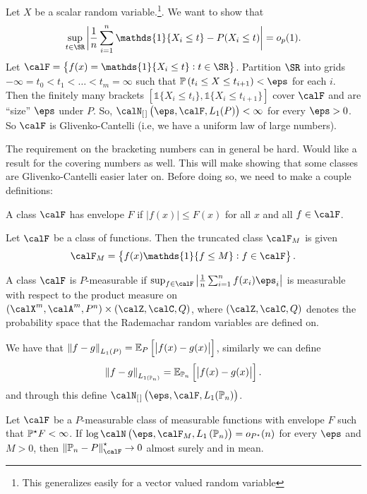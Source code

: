 \begin{example*}
	Let \(X\) be a scalar random variable.\footnote{This generalizes easily for a vector valued random variable}. We want to show that 
	\[
		\sup_{t\in\SR}\bigg| \frac{1}{n}\sum_{i=1}^n \mathds{1}\{X_i\leq t\}-P(X_i\leq t)\bigg|=o_p(1)
	.\]
	Let \(\calF = \left\{f(x)=\mathds{1}\{X_i\leq t\}: t \in \SR\right\}\). Partition \(\SR\) into grids  \(-\infty = t_0 < t_1 < \dots< t_m = \infty\) such that \(\P\left(t_i \leq X \leq t_{i+1}\right)<\eps\) for each \(i\). Then the finitely many brackets \(\left[\mathds{1}\{X_i \leq t_i\},\mathds{1}\{X_i \leq t_{i+1}\}\right]\) cover \(\calF\) and are ``size'' \(\eps\) under \(P\). So, \(\calN_{[\hspace{0.1em}]}\left(\eps,\calF,L_1(P)\right)<\infty\) for every \(\eps>0\). So \(\calF\) is Glivenko-Cantelli (i.e, we have a uniform law of large numbers).
\end{example*}
The requirement on the bracketing numbers can in general be hard. Would like a result for the covering numbers as well. This will make showing that some classes are Glivenko-Cantelli easier later on. Before doing so, we need to make a couple definitions:
\begin{definition}[Envelope]
	\label{def:envelope}
	A class \(\calF\) has envelope \(F\) if \(|f(x)|\leq F(x)\) for all \(x\) and all \(f\in\calF\).
\end{definition}
\begin{definition}
	\label{def:truncated-class}
	Let \(\calF\) be a class of functions. Then the truncated class \(\calF_M\) is given 
	\[
		\calF_M = \left\{f(x)\mathds{1}\{f \leq M\}: f\in\calF\right\}	
	.\]
\end{definition}
\begin{definition}
	\label{def:p-measurable-class}
	A class \(\calF\) is \(P\)-measurable if \(\sup_{f\in\calF}\left|\frac{1}{n}\sum_{i=1}^n f(x_i)\eps_i\right|\) is measurable with respect to the product measure on \((\calX^m,\calA^m,P^n)\times(\calZ,\calC,Q)\), where \((\calZ,\calC,Q)\) denotes the probability space that the Rademachar random variables are defined on.
\end{definition}
\begin{definition}[\(L_p(\P_n)\)-norm]
	\label{def:lpn-norm}
	We have that \(\left\|f-g\right\|_{L_1(P)} = \E_P\left[\left|f(x)-g(x)\right|\right]\), similarly we can define 
	\[
			\left\|f-g\right\|_{L_{1(\P_n)}} = \E_{\P_n}\left[\left|f(x)-g(x)\right|\right]
	.\]
	and through this define \(\calN_{[\hspace{0.1em}]}\left(\eps,\calF,L_1(\P_n)\right)\).
\end{definition}

\begin{theorem}
	\label{thm:vdv2.4.3}
	Let \(\calF\) be a  \(P\)-measurable class of measurable functions with envelope \(F\) such that \(\P^\star F<\infty\). If  \(\log\calN\left(\eps,\calF_M,L_1\left(\P_n\right)\right)= o_{P^\star}(n)\) for every \(\eps\) and  \(M > 0\), then  \(\left\|\P_n-P\right\|^\star_\calF\to 0\) almost surely and in mean. 		
\end{theorem}



